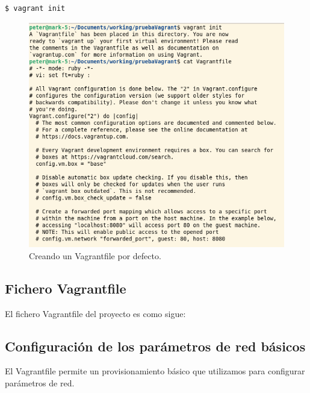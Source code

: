 \begin{lstlisting}[style=mybash]
$ vagrant init
\end{lstlisting}

\begin{figure}[H]
	\centering
	\includegraphics[scale=0.35]{img/vagrant1}
	\caption{Creando un Vagrantfile por defecto.}
\end{figure}

\newpage
\subsection{Fichero Vagrantfile}

El fichero Vagrantfile del proyecto es como sigue:



\subsection{Configuración de los parámetros de red básicos}

El Vagrantfile permite un provisionamiento básico que utilizamos para configurar parámetros de red.

